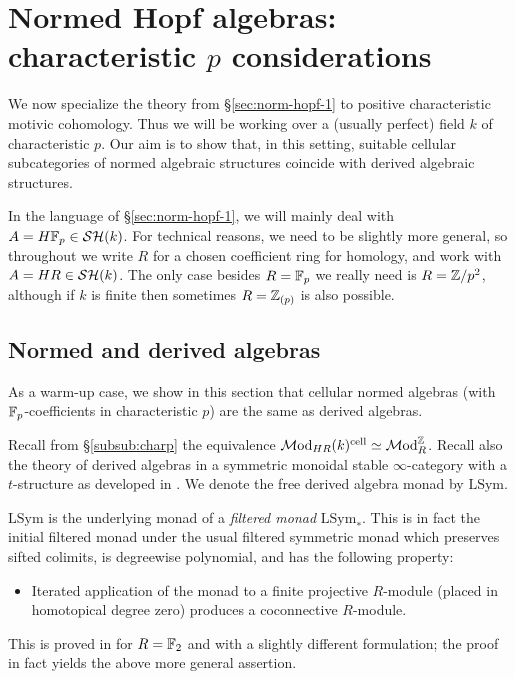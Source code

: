 \documentclass{amsart}
\numberwithin{proposition}{section}
\numberwithin{equation}{section}
\def\cell{\mathrm{cell}}
\def\LSym{\mathrm{LSym}}
\begin{document}
\section{Normed Hopf algebras: characteristic $p$ considerations} \label{sec:normed-hopf-charp}
We now specialize the theory from \S\ref{sec:norm-hopf-1} to positive characteristic motivic cohomology.
Thus we will be working over a (usually perfect) field $k$ of characteristic $p$.
Our aim is to show that, in this setting, suitable cellular subcategories of normed algebraic structures coincide with derived algebraic structures.

In the language of \S\ref{sec:norm-hopf-1}, we will mainly deal with $A = H\mathbb{F}_p \in \mathcal{SH}(k)$.
For technical reasons, we need to be slightly more general, so throughout we write $R$ for a chosen coefficient ring for homology, and work with $A=HR \in \mathcal{SH}(k)$.
The only case besides $R=\mathbb{F}_p$ we really need is $R=\mathbb{Z}/p^2$, although if $k$ is finite then sometimes $R=\mathbb{Z}_{(p)}$ is also possible.

\subsection{Normed and derived algebras} \label{subsec:normed-and-derived}
As a warm-up case, we show in this section that cellular normed algebras (with $\mathbb{F}_p$-coefficients in characteristic $p$) are the same as derived algebras.

Recall from \S\ref{subsub:charp} the equivalence $\Mod_{HR}(k)^\cell \wequi \Mod_R^\Z$.
Recall also the theory of derived algebras in a symmetric monoidal stable $\infty$-category with a $t$-structure as developed in \cite[\S4]{raksit2020hochschild}.
We denote the free derived algebra monad by $\LSym$.

\begin{remark} \label{remark:LSym-universal-property}
$\LSym$ is the underlying monad of a \emph{filtered monad} $\LSym_*$.
This is in fact the initial filtered monad under the usual filtered symmetric monad which preserves sifted colimits, is degreewise polynomial, and has the following property:
\begin{itemize}
\item Iterated application of the monad to a finite projective $R$-module (placed in homotopical degree zero) produces a coconnective $R$-module.
\end{itemize}
This is proved in \cite[Lemma 2.13]{bachmann-MHH} for $R=\mathbb{F}_2$ and with a slightly different formulation; the proof in fact yields the above more general assertion.
\end{remark}
\end{document}
